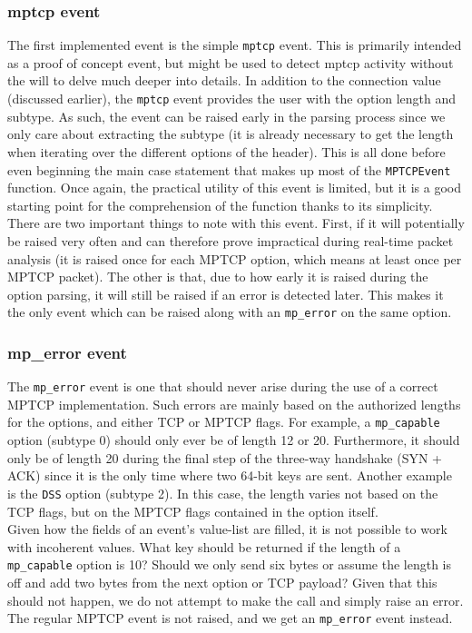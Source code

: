 \documentclass[12pt, a4paper, oneside]{article} %
\begin{document}
\subsubsection{mptcp event}
The first implemented event is the simple \texttt{mptcp} event. This is primarily intended as a proof of concept event, but might be used to detect mptcp activity without the will to delve much deeper into details. In addition to the connection value (discussed earlier), the \texttt{mptcp} event provides the user with the option length and subtype. As such, the event can be raised early in the parsing process since we only care about extracting the subtype (it is already necessary to get the length when iterating over the different options of the header). This is all done before even beginning the main case statement that makes up most of the \texttt{MPTCPEvent} function. Once again, the practical utility of this event is limited, but it is a good starting point for the comprehension of the function thanks to its simplicity. \\

There are two important things to note with this event. First, if it will potentially be raised very often and can therefore prove impractical during real-time packet analysis (it is raised once for each MPTCP option, which means at least once per MPTCP packet). The other is that, due to how early it is raised during the option parsing, it will still be raised if an error is detected later. This makes it the only event which can be raised along with an \texttt{mp\_error} on the same option.

\subsubsection{mp\_error event}
The \texttt{mp\_error} event is one that should never arise during the use of a correct MPTCP implementation. Such errors are mainly based on the authorized lengths for the options, and either TCP or MPTCP flags. For example, a \texttt{mp\_capable} option (subtype 0) should only ever be of length 12 or 20. Furthermore, it should only be of length 20 during the final step of the three-way handshake (SYN + ACK) since it is the only time where two 64-bit keys are sent. Another example is the \texttt{DSS} option (subtype 2). In this case, the length varies not based on the TCP flags, but on the MPTCP flags contained in the option itself. \\

Given how the fields of an event's value-list are filled, it is not possible to work with incoherent values. What key should be returned if the length of a \texttt{mp\_capable} option is 10? Should we only send six bytes or assume the length is off and add two bytes from the next option or TCP payload? Given that this should not happen, we do not attempt to make the call and simply raise an error. The regular MPTCP event is not raised, and we get an \texttt{mp\_error} event instead.\\
\end{document}
